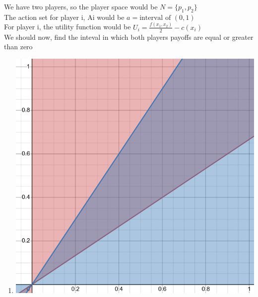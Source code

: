\begin{latin}
    \noindent
    We have two players, so the player space would be $N = \{p_1,p_2\}$ \\
    The action set for player i, Ai would be $a = \text{interval of } (0,1) $ \\
    For player i, the utility function would be $U_i = \frac{f(x_1,x_2)}{2} - c(x_i)$ \\
    We should now, find the inteval in which both players payoffs are equal or greater than zero

\begin{enumerate}
    \item  \phantom{text} \begin{center}
        \includegraphics[scale=0.3]{pics/graph1.png} 
        

\end{center}
\end{enumerate}
\end{latin}
